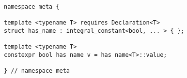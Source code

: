 
\begin{verbatim}
namespace meta {

template <typename T> requires Declaration<T>
struct has_name : integral_constant<bool, ... > { };

template <typename T>
constexpr bool has_name_v = has_name<T>::value;

} // namespace meta
\end{verbatim}
